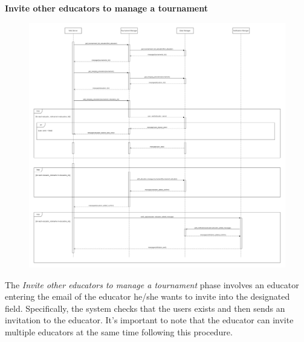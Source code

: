 \documentclass[../DD.tex]{subfiles}
\begin{document}
    \textbf{Invite other educators to manage a tournament}\\
    \begin{figure}[H]
        \centering
        \hspace*{-3cm}
        \includegraphics[width=1.35\textwidth]{../assets/section_2/InviteOtherEducatorsToManageATournament.png}
    \end{figure}
    The \textit{Invite other educators to manage a tournament} phase involves an educator entering the email of the educator he/she wants to invite into the designated field.
    Specifically, the system checks that the users exists and then sends an invitation to the educator.
    It's important to note that the educator can invite multiple educators at the same time following this procedure.
    \newpage
    \restoregeometry
\end{document}
